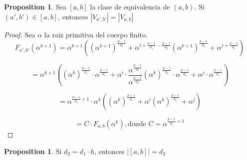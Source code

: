 \documentclass{article}
\theoremstyle{definition}
\newtheorem{prop}[theorem]{Proposition}
\theoremstyle{remark}
\numberwithin{equation}{section}
\begin{document}
\begin{prop}
  
  Sea $[a, b]$ la clase de equivalencia de $(a, b)$. Si $(a', b') \in [a, b]$, entonces 
  $|V_{a', b'}| = |V_{a, b}|$

\end{prop}

\begin{proof}
  
  Sea $\alpha$ la raiz primitiva del cuerpo finito. $$F_{a', b'}(\alpha^{k+1}) = \alpha^{k+1}((\alpha^{k+1})^{\frac{p-1}{d_1}} + \alpha^{i + \frac{p-1}{d_1} - \frac{p-1}{d_2}}(\alpha^{k+1})^{\frac{p-1}{d_2}} + \alpha^{j + \frac{p-1}{d_1}})$$

  $$= \alpha^{k+1}((\alpha^{k})^{\frac{p-1}{d_1}} \cdot \alpha^{\frac{p-1}{d_1}} + \alpha^{i} \cdot \frac{\alpha^{\frac{p-1}{d_1}}} {\alpha^{\frac{p-1}{d_2}}} (\alpha^{k})^{\frac{p-1}{d_2}} \cdot \alpha^{\frac{p-1}{d_2}} + \alpha^{j} \cdot \alpha^{\frac{p-1}{d_1}})$$

  $$= \alpha^{\frac{p-1}{d_1} + 1} \cdot \alpha^{k}((\alpha^{k})^{\frac{p-1}{d_1}} + \alpha^{i}(\alpha^{k})^{\frac{p-1}{d_2}} + \alpha^{j} )$$

  $$= C \cdot F_{a,b}(\alpha^k), \mbox{donde } C = \alpha^{\frac{p-1}{d_1} + 1}$$


\end{proof}

\begin{prop}
  
  Si $d_2 = d_1 \cdot h$, entonces $|[a, b]| = d_2$

\end{prop}
\end{document}
